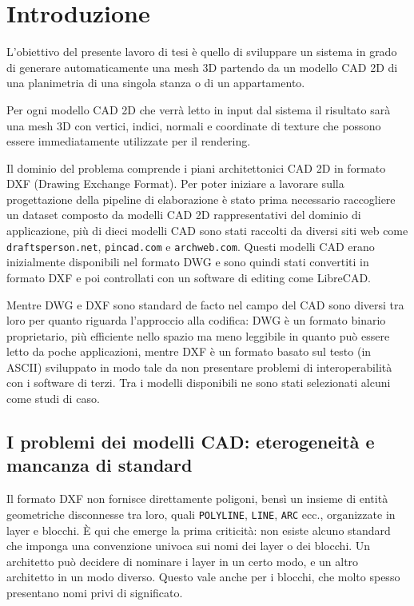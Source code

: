 \chapter{Introduzione}
\label{ch:introduzione}

L'obiettivo del presente lavoro di tesi è quello di sviluppare un sistema in grado di generare automaticamente una mesh 3D partendo da un modello CAD 2D di una planimetria di una singola stanza o di un appartamento.

Per ogni modello CAD 2D che verrà letto in input dal sistema il risultato sarà una mesh 3D con vertici, indici, normali e coordinate di texture che possono essere immediatamente utilizzate per il rendering.

Il dominio del problema comprende i piani architettonici CAD 2D in formato DXF (Drawing Exchange Format). Per poter iniziare a lavorare sulla progettazione della pipeline di elaborazione è stato prima necessario raccogliere un dataset composto da modelli CAD 2D rappresentativi del dominio di applicazione, più di dieci modelli CAD sono stati raccolti da diversi siti web come \texttt{draftsperson.net}, \texttt{pincad.com} e \texttt{archweb.com}.
Questi modelli CAD erano inizialmente disponibili nel formato DWG e sono quindi stati convertiti in formato DXF e poi controllati con un software di editing come LibreCAD.

Mentre DWG e DXF sono standard de facto nel campo del CAD sono diversi tra loro per quanto riguarda l'approccio alla codifica: DWG è un formato binario proprietario, più efficiente nello spazio ma meno leggibile in quanto può essere letto da poche applicazioni, mentre DXF è un formato basato sul testo (in ASCII) sviluppato in modo tale da non presentare problemi di interoperabilità con i software di terzi. \cite{adobe_dwg_dxf} Tra i modelli disponibili ne sono stati selezionati alcuni come studi di caso.

\section{I problemi dei modelli CAD: eterogeneità e mancanza di standard}
\label{sec:problemi_modelli_CAD}

Il formato DXF non fornisce direttamente poligoni, bensì un insieme di entità geometriche disconnesse tra loro, quali \texttt{POLYLINE}, \texttt{LINE}, \texttt{ARC} ecc., organizzate in layer e blocchi. È qui che emerge la prima criticità: non esiste alcuno standard che imponga una convenzione univoca sui nomi dei layer o dei blocchi. Un architetto può decidere di nominare i layer in un certo modo, e un altro architetto in un modo diverso. Questo vale anche per i blocchi, che molto spesso presentano nomi privi di significato.

